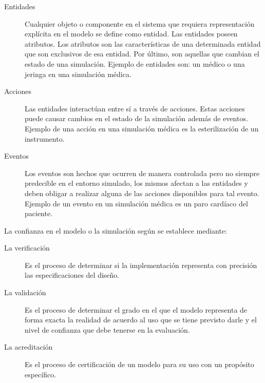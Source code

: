 \begin{description}

\item[Entidades] Cualquier objeto o componente en el sistema que requiera
	representación explícita en el modelo se define como
	entidad\cite{banks2000dm}. Las entidades poseen atributos. Los atributos
	son las características de una determinada entidad que son exclusivos de
	esa entidad. Por último, son aquellas que cambian el estado de una
	simulación. Ejemplo de entidades son: un médico o una jeringa en una
	simulación médica.

\item[Acciones] Las entidades interactúan entre sí a través de acciones. Estas
	acciones puede causar cambios en el estado de la simulación además de
	eventos. Ejemplo de una acción en una simulación médica es la
	esterilización de un instrumento.

\item[Eventos] Los eventos son hechos que ocurren de manera controlada pero no
	siempre predecible en el entorno simulado, los mismos afectan a las
	entidades y deben obligar a realizar alguna de las acciones disponibles
	para tal evento. Ejemplo de un evento en un simulación médica es un paro
	cardíaco del paciente.

\end{description}

La confianza en el modelo o la simulación según\cite{DoDSysEng2001} se establece
mediante:

\begin{description}

\item[La verificación] Es el proceso de determinar si la implementación
	representa con precisión las especificaciones del diseño. 

\item[La validación] Es el proceso de determinar el grado en el que el modelo
	representa de forma exacta la realidad de acuerdo al uso que se tiene
	previsto darle y el nivel de confianza que debe tenerse en la
	evaluación.

\item[La acreditación] Es el proceso de certificación de un modelo para su uso
	con un propósito específico.

\end{description}




